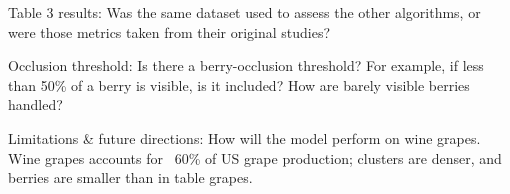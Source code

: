 \documentclass{ar2rc}
\begin{document}
\begin{tcolorbox}[title = {Comment \#3}, fonttitle = \bfseries]
    Table 3 results: Was the same dataset used to assess the other algorithms, or were those metrics taken from their original studies?
\end{tcolorbox}




\begin{tcolorbox}[title = {Comment \#4}, fonttitle = \bfseries]
    Occlusion  threshold: Is there a berry-occlusion threshold? For example, if less  than 50\% of a berry is visible, is it included? How are barely visible  berries handled?
\end{tcolorbox}




\begin{tcolorbox}[title = {Comment \#5}, fonttitle = \bfseries]
    Limitations \& future directions: How will the  model perform on wine grapes. Wine grapes accounts for ~60\% of US grape  production; clusters are denser, and berries are smaller than in table grapes.
\end{tcolorbox}





\phantom{\cite{}} %

\renewcommand{\bibsection}{} %

\end{document}
